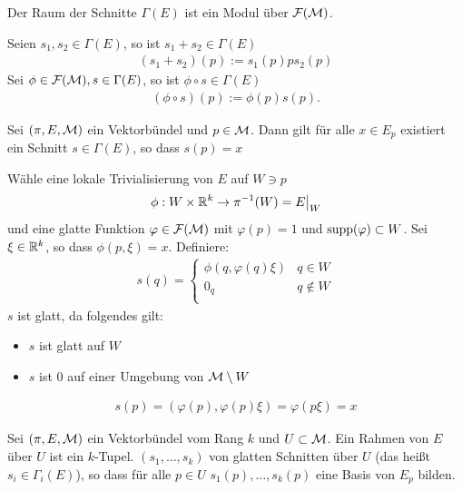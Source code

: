 \begin{satz}
\label{satz:SchnitteModul}
Der Raum der Schnitte $\Gamma (E)$ ist ein Modul über $\mathcal{F}(\mathcal{M})$.
\end{satz}

\begin{bew}
Seien $s_1, s_2 \in \Gamma (E)$, so ist $s_1 + s_2 \in \Gamma (E)$
\begin{align}
(s_1 + s_2)(p) := s_1 (p) p s_2 (p)
\end{align}
Sei $\phi \in \mathcal{F}(\mathcal{M}), s\in \Gamma(E)$, so ist $\phi \circ s \in \Gamma (E)$
\begin{align}
(\phi \circ s) (p) := \phi (p) s(p).
\end{align}
\end{bew}

\begin{lem}
Sei $(\pi, E, \mathcal{M})$ ein Vektorbündel und $p \in \mathcal{M}$.
Dann gilt für alle $x \in E_p$ existiert ein Schnitt $s \in \Gamma (E)$, so dass $s(p)=x$
\end{lem}
\begin{bew}
Wähle eine lokale Trivialisierung von $E$ auf $W \ni p$
\begin{align}
\phi: W \times \mathbb{R}^k \to \pi^{-1}(W) = E\big\vert_W
\end{align}
und eine glatte Funktion $\varphi \in \mathcal{F}(\mathcal{M})$ mit $\varphi(p)=1$ und $\operatorname{supp}(\varphi) \subset W$.
Sei $\xi \in \mathbb{R}^k$, so dass $\phi (p, \xi)=x$.
Definiere:
\begin{align}
s(q) = \left\{
\begin{array}{ll}
\phi(q, \varphi(q)\xi) & q\in W \\
0_q & q \not\in W \\
\end{array}
\right.
\end{align}
$s$ ist glatt, da folgendes gilt:
\begin{itemize}
\item $s$ ist glatt auf $W$
\item $s$ ist $0$ auf einer Umgebung von $\mathcal{M} \setminus W$
\end{itemize}
\begin{align}
s(p) = ( \varphi(p), \varphi(p) \xi ) = \varphi (p \xi) = x
\end{align}
\end{bew}

\begin{defs}
Sei $(\pi, E, \mathcal{M})$ ein Vektorbündel vom Rang $k$ und $U \subset \mathcal{M}$.
Ein Rahmen von $E$ über $U$ ist ein $k$-Tupel.
$(s_1, \dots, s_k)$ von glatten Schnitten über $U$ (das heißt $s_i \in \Gamma_i (E)$), so dass für alle $p \in U$
$s_1 (p), \dots, s_k (p)$ eine Basis von $E_p$ bilden.
\end{defs}